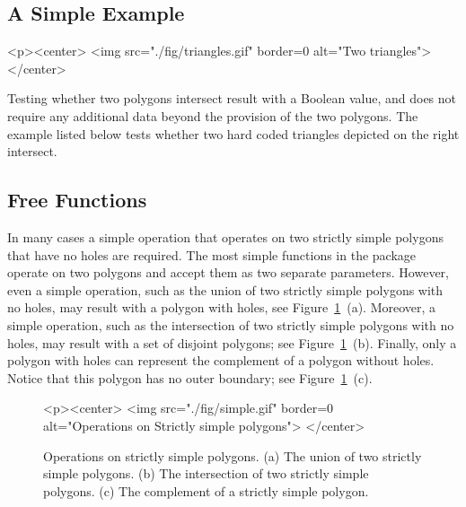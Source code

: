 \subsection{A Simple Example}
\label{bso_ssec:simple_example}
\begin{ccHtmlOnly}
  <p><center>
    <img src="./fig/triangles.gif" border=0 alt="Two triangles">
  </center>
\end{ccHtmlOnly}
Testing whether two polygons intersect result with a Boolean value, 
and does not require any additional data beyond the provision of the 
two polygons. The example listed below tests whether two hard coded 
triangles depicted on the right intersect.


\subsection{Free Functions}
\label{bso_ssec:free_functions}
In many cases a simple operation that operates on two strictly simple
polygons that have no holes are required. The most simple functions in
the package operate on two polygons and accept them as two separate
parameters. However, even a simple operation, such as the union of two
strictly simple polygons with no holes, may result with a polygon with
holes, see Figure~\ref{fig:simple}~(a). Moreover, a simple operation,
such as the intersection of two strictly simple polygons with no holes, 
may result with a set of disjoint polygons; see
Figure~\ref{fig:simple}~(b). Finally, only a polygon with holes can
represent the complement of a polygon without holes. Notice that this
polygon has no outer boundary; see Figure~\ref{fig:simple}~(c).

\begin{figure}[!htp]
\begin{ccTexOnly}

\end{ccTexOnly}
\begin{ccHtmlOnly}
  <p><center>
    <img src="./fig/simple.gif" border=0 alt="Operations on Strictly
    simple polygons">
  </center>
\end{ccHtmlOnly}
\caption{Operations on strictly simple polygons. (a) The union of two
strictly simple polygons. (b) The intersection of two strictly simple
polygons. (c) The complement of a strictly simple polygon.} 
\label{fig:simple}
\end{figure}

